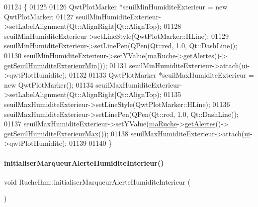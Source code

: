 \begin{DoxyCode}
01124 \{
01125 
01126     QwtPlotMarker *seuilMinHumiditeExterieur = \textcolor{keyword}{new} QwtPlotMarker;
01127     seuilMinHumiditeExterieur->setLabelAlignment(Qt::AlignRight|Qt::AlignTop);
01128     seuilMinHumiditeExterieur->setLineStyle(QwtPlotMarker::HLine);
01129     seuilMinHumiditeExterieur->setLinePen(QPen(Qt::red, 1.0, Qt::DashLine));
01130     seuilMinHumiditeExterieur->setYValue(\hyperlink{class_ruche_ihm_a43a6b1fa31f4fba58d919daae3707b38}{maRuche}->\hyperlink{class_ruche_a9edbc2e81ccb2cb76de43639bcb16ec1}{getAlertes}()->
      \hyperlink{class_alertes_a68e467e042b615f56347a0953d6e64f1}{getSeuilHumiditeExterieurMin}());
01131     seuilMinHumiditeExterieur->attach(\hyperlink{class_ruche_ihm_a64786058bd7f88ca2f1e9743bb27c25b}{ui}->qwtPlotHumidite);
01132 
01133     QwtPlotMarker *seuilMaxHumiditeExterieur = \textcolor{keyword}{new} QwtPlotMarker();
01134     seuilMaxHumiditeExterieur->setLabelAlignment(Qt::AlignRight|Qt::AlignTop);
01135     seuilMaxHumiditeExterieur->setLineStyle(QwtPlotMarker::HLine);
01136     seuilMaxHumiditeExterieur->setLinePen(QPen(Qt::red, 1.0, Qt::DashLine));
01137     seuilMaxHumiditeExterieur->setYValue(\hyperlink{class_ruche_ihm_a43a6b1fa31f4fba58d919daae3707b38}{maRuche}->\hyperlink{class_ruche_a9edbc2e81ccb2cb76de43639bcb16ec1}{getAlertes}()->
      \hyperlink{class_alertes_ad2c8daf5668f5d122efb9b84f7ea86de}{getSeuilHumiditeExterieurMax}());
01138     seuilMaxHumiditeExterieur->attach(\hyperlink{class_ruche_ihm_a64786058bd7f88ca2f1e9743bb27c25b}{ui}->qwtPlotHumidite);
01139 
01140 \}
\end{DoxyCode}
\mbox{\label{class_ruche_ihm_a42785d6da8aca09d8becb6d500de8d9f}} 
\paragraph{\texorpdfstring{initialiser\+Marqueur\+Alerte\+Humidite\+Interieur()}{initialiserMarqueurAlerteHumiditeInterieur()}}
{\footnotesize\ttfamily void Ruche\+Ihm\+::initialiser\+Marqueur\+Alerte\+Humidite\+Interieur (\begin{DoxyParamCaption}{ }\end{DoxyParamCaption})\hspace{0.3cm}{\ttfamily [private]}}



